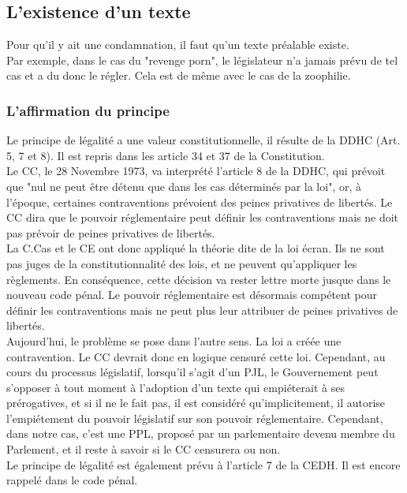 \documentclass[10pt, a4paper, openany]{book}
\begin{document}
\subsection{L'existence d'un texte}

Pour qu'il y ait une condamnation, il faut qu'un texte préalable existe. \\
Par exemple, dans le cas du "revenge porn", le législateur n'a jamais prévu de tel cas et a du donc le régler. Cela est de même avec le cas de la zoophilie.


\subsubsection{L'affirmation du principe}

Le principe de légalité a une valeur constitutionnelle, il résulte de la DDHC (Art. 5, 7 et 8). Il est repris dans les article 34 et 37 de la Constitution. \\
Le CC, le 28 Novembre 1973, va interprété l'article 8 de la DDHC, qui prévoit que "nul ne peut être détenu que dans les cas déterminés par la loi", or, à l'époque, certaines contraventions prévoient des peines privatives de libertés. Le CC dira que le pouvoir réglementaire peut définir les contraventions mais ne doit pas prévoir de peines privatives de libertés. \\
La C.Cas et le CE ont donc appliqué la théorie dite de la loi écran. Ils ne sont pas juges de la constitutionnalité des lois, et ne peuvent qu'appliquer les règlements. En conséquence, cette décision va rester lettre morte jusque dans le nouveau code pénal. Le pouvoir réglementaire est désormais compétent pour définir les contraventions mais ne peut plus leur attribuer de peines privatives de libertés. \\
Aujourd'hui, le problème se pose dans l'autre sens. La loi a créée une contravention. Le CC devrait donc en logique censuré cette loi. Cependant, au cours du processus législatif, lorsqu'il s'agit d'un PJL, le Gouvernement peut s'opposer à tout moment à l'adoption d'un texte qui empiéterait à ses prérogatives, et si il ne le fait pas, il est considéré qu'implicitement, il autorise l'empiétement du pouvoir législatif sur son pouvoir réglementaire. Cependant, dans notre cas, c'est une PPL, proposé par un parlementaire devenu membre du Parlement, et il reste à savoir si le CC censurera ou non. \\
Le principe de légalité est également prévu à l'article 7 de la CEDH. Il est encore rappelé dans le code pénal.
\end{document}

